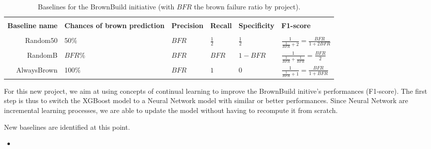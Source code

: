 \begin{table*}[h!]
	\centering
	\caption{\label{brownbuild:baselines} Baselines for the BrownBuild initiative (with $BFR$ the brown failure ratio by project). }
	\begin{tabular}{|r|p{2cm}|l|l|l|l|}
		\hline
		\\[-1em]
		\textbf{Baseline name}& \textbf{Chances of brown prediction}& \textbf{Precision} & \textbf{Recall} & \textbf{Specificity} & \textbf{F1-score}\\
		\hline
		\\[-1em]
		Random50   &50\%&$BFR$&$\frac{1}{2}$&$\frac{1}{2}$&$\frac{1}{\frac{1}{BFR}+2} = \frac{BFR}{1+2BFR}$\\%
		RandomB    &$BFR$\%&$BFR$&$BFR$          &$1-BFR$&$\frac{1}{\frac{1}{BFR}+\frac{1}{BFR}} = \frac{BFR}{2}$\\%
		AlwaysBrown&100\%&$BFR$&$1$          &$0$&$\frac{1}{\frac{1}{BFR}+1} = \frac{BFR}{1+BFR}$\\			
		\hline
	\end{tabular}
\end{table*}


For this new project, we aim at using concepts of continual learning to improve the BrownBuild initive's performances (F1-score). The first step is thus to switch the XGBoost model to a Neural Network model with similar or better performances. Since Neural Network are incremental learning processes, we are able to update the model without having to recompute it from scratch.

New baselines are identified at this point. 
\begin{itemize}
	\item 
\end{itemize}

